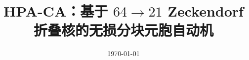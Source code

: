 \documentclass[11pt,letterpaper]{ctexart}
\title{HPA-CA：基于 $64\to 21$ Zeckendorf 折叠核的无损分块元胞自动机}
\author{}
\date{\today}
\begin{document}
\maketitle















\FloatBarrier
\appendix


\FloatBarrier

\end{document}
